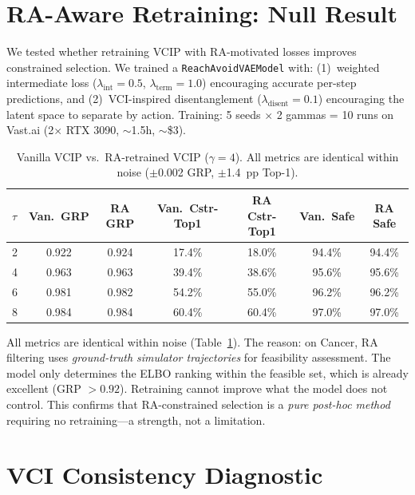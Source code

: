 \documentclass{article}
\begin{document}
\section{RA-Aware Retraining: Null Result}
\label{sec:retraining_result}

We tested whether retraining VCIP with RA-motivated losses improves constrained selection. We trained a \texttt{ReachAvoidVAEModel} with: (1)~weighted intermediate loss ($\lambda_{\text{int}} = 0.5$, $\lambda_{\text{term}} = 1.0$) encouraging accurate per-step predictions, and (2)~VCI-inspired disentanglement ($\lambda_{\text{disent}} = 0.1$) encouraging the latent space to separate by action. Training: 5 seeds $\times$ 2 gammas = 10 runs on Vast.ai (2$\times$ RTX 3090, ${\sim}$1.5h, ${\sim}$\$3).

\begin{table}[h]
\centering
\caption{Vanilla VCIP vs.\ RA-retrained VCIP ($\gamma = 4$). All metrics are identical within noise ($\pm$0.002 GRP, $\pm$1.4~pp Top-1).}
\label{tab:retraining}
\small
\begin{tabular}{l c c c c c c}
\toprule
$\tau$ & Van.\ GRP & RA GRP & Van.\ Cstr-Top1 & RA Cstr-Top1 & Van.\ Safe & RA Safe \\
\midrule
2 & 0.922 & 0.924 & 17.4\% & 18.0\% & 94.4\% & 94.4\% \\
4 & 0.963 & 0.963 & 39.4\% & 38.6\% & 95.6\% & 95.6\% \\
6 & 0.981 & 0.982 & 54.2\% & 55.0\% & 96.2\% & 96.2\% \\
8 & 0.984 & 0.984 & 60.4\% & 60.4\% & 97.0\% & 97.0\% \\
\bottomrule
\end{tabular}
\end{table}

All metrics are identical within noise (Table~\ref{tab:retraining}). The reason: on Cancer, RA filtering uses \emph{ground-truth simulator trajectories} for feasibility assessment. The model only determines the ELBO ranking within the feasible set, which is already excellent (GRP $> 0.92$). Retraining cannot improve what the model does not control. This confirms that RA-constrained selection is a \emph{pure post-hoc method} requiring no retraining---a strength, not a limitation.


\section{VCI Consistency Diagnostic}
\label{sec:e4_diagnostic}
\end{document}
